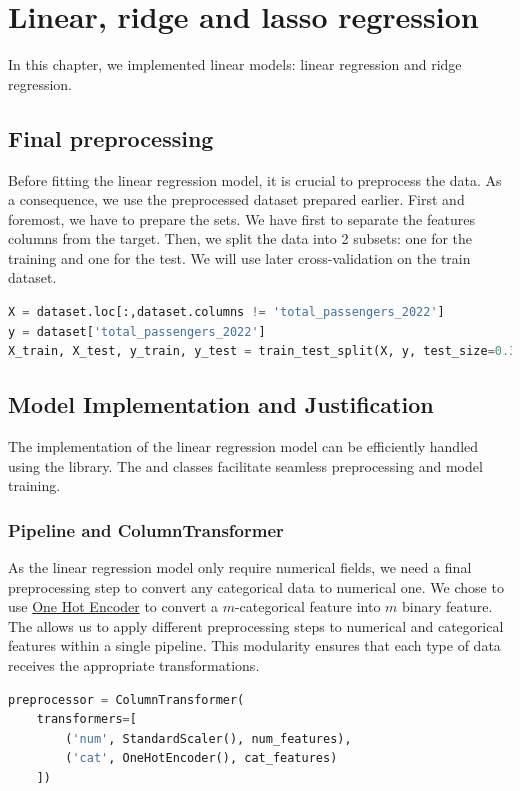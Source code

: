 \section{Linear, ridge and lasso regression}
In this chapter, we implemented linear models: linear regression and ridge regression.
\subsection{Final preprocessing}
Before fitting the linear regression model, it is crucial to preprocess the data. As a consequence, we use the preprocessed dataset prepared earlier.
First and foremost, we have to prepare the sets. We have first to separate the features columns from the target. Then, we split the data into 2 subsets: one for the training and one for the test. We will use later cross-validation on the train dataset.
\begin{lstlisting}[language=python]
X = dataset.loc[:,dataset.columns != 'total_passengers_2022']
y = dataset['total_passengers_2022']
X_train, X_test, y_train, y_test = train_test_split(X, y, test_size=0.33, random_state=42)
\end{lstlisting}

\subsection{Model Implementation and Justification}
The implementation of the linear regression model can be efficiently handled using the  library. The  and  classes facilitate seamless preprocessing and model training.

\subsubsection{Pipeline and ColumnTransformer}
As the linear regression model only require numerical fields, we need a final preprocessing step to convert any categorical data to numerical one. We chose to use \href{https://scikit-learn.org/stable/modules/generated/sklearn.preprocessing.OneHotEncoder.html}{One Hot Encoder} to convert a $m$-categorical feature into $m$ binary feature.
The  allows us to apply different preprocessing steps to numerical and categorical features within a single pipeline. This modularity ensures that each type of data receives the appropriate transformations.

\begin{lstlisting}[language=Python]
preprocessor = ColumnTransformer(
    transformers=[
        ('num', StandardScaler(), num_features),
        ('cat', OneHotEncoder(), cat_features)
    ])
\end{lstlisting}

